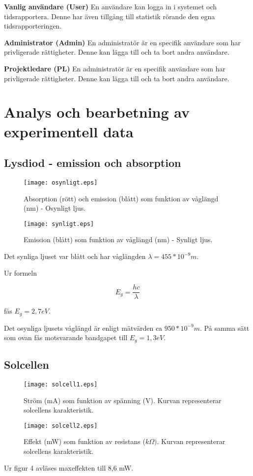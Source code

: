 \textbf{Vanlig användare (User)} En användare kan logga in i systemet och tidsrapportera. Denne har även tillgång till statistik rörande den egna tidsrapporteringen.

\textbf{Administrator (Admin)} En administratör är en specifik användare som har privligerade rättigheter. Denne kan lägga till och ta bort andra användare.

\textbf{Projektledare (PL)} En administratör är en specifik användare som har privligerade rättigheter. Denne kan lägga till och ta bort andra användare.

\pagebreak
\section{Analys och bearbetning av experimentell data}
\subsection{Lysdiod - emission och absorption}
\begin{figure}[htb]
\centering
\texttt{[image: osynligt.eps]}
\caption{Absorption (rött) och emission (blått) som funktion av våglängd (nm) - Osynligt ljus.}
\end{figure} 

\begin{figure}[htb]
\centering
\texttt{[image: synligt.eps]}
\caption{Emission (blått) som funktion av våglängd (nm) - Synligt ljus.}
\end{figure} 

Det synliga ljuset var blått och har våglängden 
\begin{math} \lambda = 455*10^{-9} m.
\end{math}

Ur formeln 

\begin{equation}
E_{g}= \frac {hc}{\lambda} \label{ekv1} 
\end{equation}

fås $E_{g}=2,7eV$.

Det osynliga ljusets våglängd är enligt mätvärden ca $950*10^{-9}m$.
På samma sätt som ovan fås motsvarande bandgapet till $E_{g}=1,3 eV$.


\subsection{Solcellen}
\begin{figure}[htb]
\centering
\texttt{[image: solcell1.eps]}
\caption{Ström (mA) som funktion av spänning (V). Kurvan representerar solcellens karakteristik.}
\end{figure} 
\begin{figure}[htb]
\centering
\texttt{[image: solcell2.eps]}
\caption{Effekt (mW) som funktion av resistans ($k\Omega)$. Kurvan representerar solcellens karakteristik.}
\end{figure} 
Ur figur 4 avläses maxeffekten till 8,6 mW.

